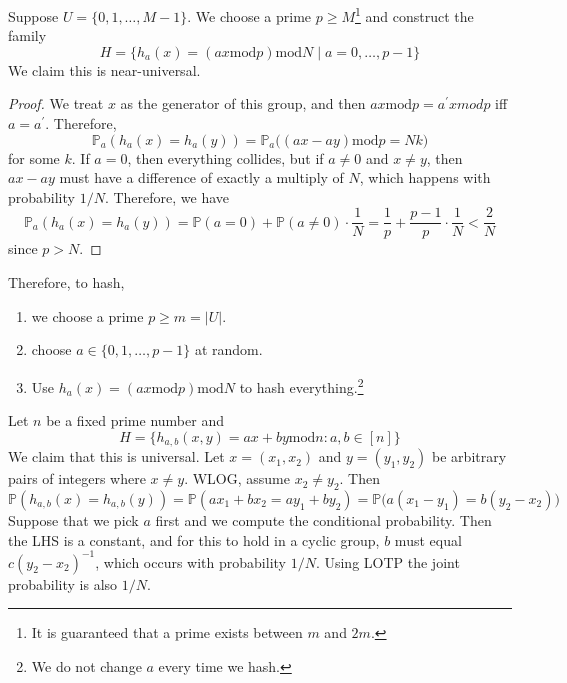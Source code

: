 \documentclass{article}
\begin{document}
    \begin{lemma}
      Suppose $U = \{0, 1, \ldots, M-1\}$. We choose a prime $p \geq M$\footnote{It is guaranteed that a prime exists between $m$ and $2m$.} and construct the family 
      \begin{equation}
        H = \{h_a (x) = (ax \mathrm{ mod } p ) \mathrm{ mod } N \mid a = 0, \ldots, p-1 \}
      \end{equation}
      We claim this is near-universal. 
    \end{lemma}
    \begin{proof}
      We treat $x$ as the generator of this group, and then $ax \mathrm{ mod } p = a^\prime x { mod } p$ iff $a = a^\prime$. Therefore, 
      \begin{equation}
        \mathbb{P}_a (h_a (x) = h_a (y)) = \mathbb{P}_a \big( (ax - ay) \mathrm{ mod } p = N k \big)
      \end{equation}
      for some $k$. If $a = 0$, then everything collides, but if $a \neq 0$ and $x \neq y$, then $ax - ay$ must have a difference of exactly a multiply of $N$, which happens with probability $1/N$. Therefore, we have 
      \begin{equation}
        \mathbb{P}_a (h_a (x) = h_a (y)) = \mathbb{P}(a = 0) + \mathbb{P}(a \neq 0) \cdot \frac{1}{N} = \frac{1}{p} + \frac{p-1}{p} \cdot \frac{1}{N} < \frac{2}{N} 
      \end{equation}
      since $p > N$. 
    \end{proof}

    Therefore, to hash, 
    \begin{enumerate}
      \item we choose a prime $p \geq m = |U|$. 
      \item choose $a \in \{0, 1, \ldots, p-1\}$ at random. 
      \item Use $h_a(x) = (ax \mathrm{ mod } p ) \mathrm{ mod } N$ to hash everything.\footnote{We do not change $a$ every time we hash. }
    \end{enumerate}

    \begin{example}
      Let $n$ be a fixed prime number and 
      \begin{equation}
        H = \{h_{a, b} (x, y) = ax + by \mathrm{ mod } n : a, b \in [n] \}
      \end{equation} 
      We claim that this is universal. Let $x = (x_1, x_2)$ and $y = (y_1, y_2)$ be arbitrary pairs of integers where $x \neq y$. WLOG, assume $x_2 \neq y_2$. Then 
      \begin{equation}
        \mathbb{P}(h_{a, b} (x) = h_{a, b} (y)) = \mathbb{P}(a x_1 + b x_2 = a y_1 + b y_2) = \mathbb{P}\big( a (x_1 - y_1) = b (y_2 - x_2) \big)
      \end{equation} 
      Suppose that we pick $a$ first and we compute the conditional probability. Then the LHS is a constant, and for this to hold in a cyclic group, $b$ must equal $c (y_2 - x_2)^{-1}$, which occurs with probability $1/N$. Using LOTP the joint probability is also $1/N$. 
    \end{example}
\end{document}
